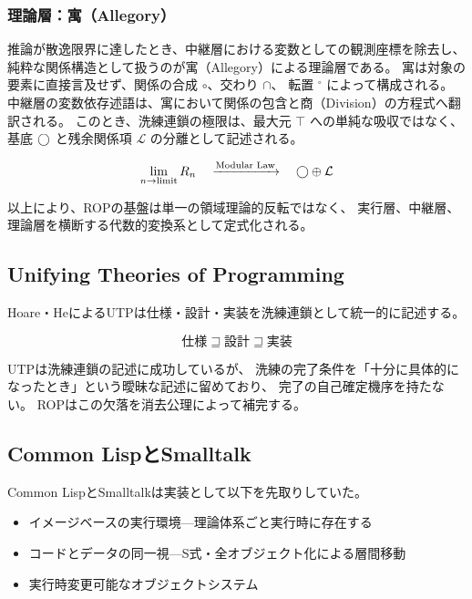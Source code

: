 \documentclass[11pt,a4paper]{ltjsarticle}
\theoremstyle{definition}
\newcommand{\Lhagma}{\mathcal{L}}
\begin{document}
\subsubsection{理論層：寓（Allegory）}

推論が散逸限界に達したとき、中継層における変数としての観測座標を除去し、
純粋な関係構造として扱うのが寓（Allegory）による理論層である。
寓は対象の要素に直接言及せず、関係の合成 $\circ$、交わり $\cap$、
転置 $^\circ$ によって構成される。
中継層の変数依存述語は、寓において関係の包含と商（Division）の方程式へ翻訳される。
このとき、洗練連鎖の極限は、最大元 $\top$ への単純な吸収ではなく、
基底 $\bigcirc$ と残余関係項 $\Lhagma$ の分離として記述される。

\begin{equation}
\lim_{n \to \text{limit}} R_n \quad \xrightarrow{\text{Modular Law}} \quad \dfix \oplus \Lhagma
\end{equation}

以上により、ROPの基盤は単一の領域理論的反転ではなく、
実行層、中継層、理論層を横断する代数的変換系として定式化される。

\subsection{Unifying Theories of Programming}

Hoare・HeによるUTP\cite{Hoare1998}は仕様・設計・実装を洗練連鎖として統一的に記述する。

\begin{equation}
\text{仕様} \sqsupseteq \text{設計} \sqsupseteq \text{実装}
\end{equation}

UTPは洗練連鎖の記述に成功しているが、
洗練の完了条件を「十分に具体的になったとき」という曖昧な記述に留めており、
完了の自己確定機序を持たない。
ROPはこの欠落を消去公理によって補完する。

\subsection{Common LispとSmalltalk}

Common LispとSmalltalkは実装として以下を先取りしていた。

\begin{itemize}
  \item イメージベースの実行環境---理論体系ごと実行時に存在する
  \item コードとデータの同一視---S式・全オブジェクト化による層間移動
  \item 実行時変更可能なオブジェクトシステム
\end{itemize}
\end{document}

